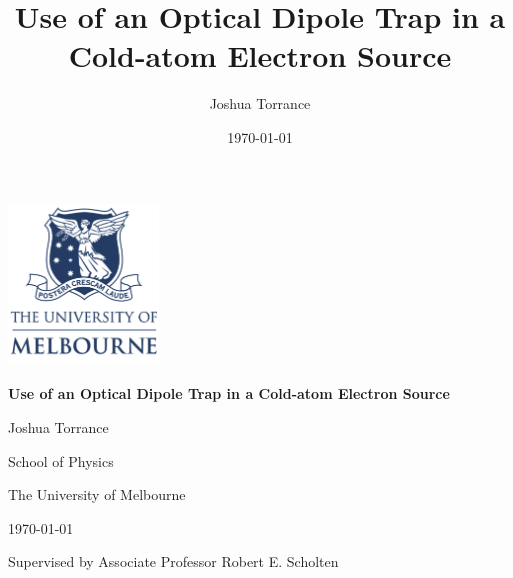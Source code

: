 \documentclass[12pt]{report}
\title{Use of an Optical Dipole Trap in a Cold-atom Electron Source}
\author{Joshua Torrance}
\date{\today}
\begin{document}

\renewcommand{\footnotesize}{\small}
\renewcommand{\footnoterule}{\relax}
\thispagestyle{empty}
\begin{center}
    {{{\includegraphics[width=4cm]{figs/unimelb.png}} \par}
 \Huge {\bfseries {Use of an Optical Dipole Trap in a Cold-atom Electron Source}} \par}
{\large \vspace*{35mm} \vspace*{15mm}}
    {{\vspace*{25mm} \Large {Joshua Torrance}} \par} 
{\large 
    \vspace*{1ex}
    {{School of Physics} \par}
    \vspace*{1ex}
    {{The University of Melbourne} \par}
    \vspace*{25mm}
    {\today\par}
    {Supervised by Associate Professor Robert E. Scholten\par}
}%
\end{center}
\null\vfill




\tableofcontents


\renewcommand{\chaptername}{} %


\glsresetall

\glsresetall
%

\glsresetall

\glsresetall

\glsresetall


\twocolumn
\printglossaries
\onecolumn


\end{document}
